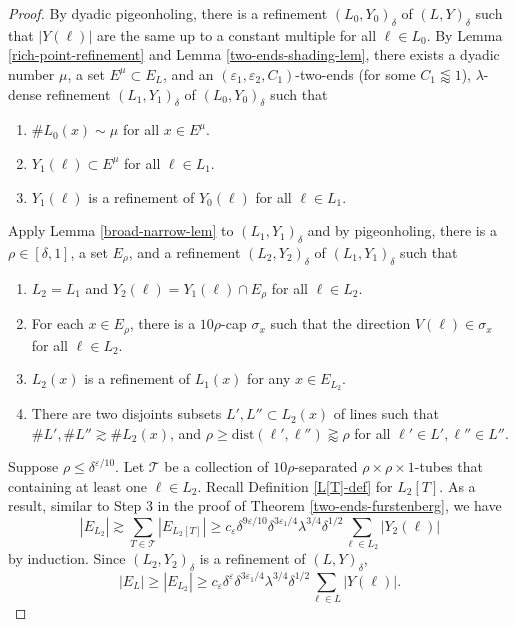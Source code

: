 \documentclass{amsart}
\numberwithin{equation}{section}
\newcommand{\de}{\delta}
\newcommand{\e}{\varepsilon}
\newcommand{\la}{\lambda}
\newcommand{\si}{\sigma}
\newcommand{\cT}{{\mathcal T}}
\begin{document}
\begin{proof}
By dyadic pigeonholing, there is a refinement $(L_0,Y_0)_\de$ of $(L,Y)_\de$ such that $|Y(\ell)|$ are the same up to a constant multiple for all $\ell\in L_0$. 
By Lemma \ref{rich-point-refinement} and Lemma \ref{two-ends-shading-lem}, there exists a dyadic number $\mu$, a set $E^\mu\subset E_L$, and an $(\e_1, \e_2, C_1)$-two-ends (for some $C_1\lessapprox 1$), $\la$-dense refinement $(L_1,Y_1)_\de$ of $(L_0,Y_0)_\de$ such that 
\begin{enumerate}
    \item $\#L_0(x)\sim\mu$ for all $x\in E^\mu$.
    \item $Y_1(\ell)\subset E^\mu$ for all $\ell\in L_1$.
    \item $Y_1(\ell)$ is a refinement of $Y_0(\ell)$ for all $\ell\in L_1$.
\end{enumerate}
Apply Lemma \ref{broad-narrow-lem} to $(L_1, Y_1)_\de$ and by pigeonholing, there is a $\rho\in[\de,1]$, a set $E_\rho$, and a refinement $(L_2, Y_2)_\de$ of $(L_1, Y_1)_\de$ such that
\begin{enumerate}
    \item $L_2=L_1$ and $Y_2(\ell)=Y_1(\ell)\cap E_\rho$ for all $\ell\in L_2$.
    \item For each $x\in E_\rho$, there is a $10\rho$-cap $\si_x$ such that the direction $V(\ell)\in \si_x$ for all $\ell\in L_2$.
    \item $L_2(x)$ is a refinement of $L_1(x)$ for any $x\in E_{L_2}$.
    \item There are two disjoints subsets $L', L''\subset L_2(x)$ of lines such that $\# L', \# L''\gtrsim \# L_2(x)$, and $\rho\geq\text{dist}(\ell',\ell'')\gtrapprox \rho$ for all $\ell'\in L',\ell''\in L''$.
\end{enumerate}


\smallskip

Suppose $\rho\leq \de^{\e/10}$.
Let $\cT$ be a collection of $10\rho$-separated $\rho\times\rho\times 1$-tubes that containing at least one $\ell\in L_2$.
Recall Definition \ref{L[T]-def} for $L_2[T]$.
As a result, similar to Step 3 in the proof of Theorem \ref{two-ends-furstenberg}, we have
\begin{equation}
    |E_{L_2}|\gtrsim \sum_{T\in\cT}|E_{L_2[T]}|\geq c_\e\de^{9\e/10} \de^{3\e_1/4}\la^{3/4}\de^{1/2}\sum_{\ell\in L_2}|Y_2(\ell)|
\end{equation}
by induction. 
Since $(L_2, Y_2)_\de$ is a refinement of $(L, Y)_\de$,
\begin{equation}
    |E_{L}|\geq|E_{L_2}|\geq c_\e\de^\e \de^{3\e_1/4}\la^{3/4}\de^{1/2}\sum_{\ell\in L}|Y(\ell)|.
\end{equation}



\end{proof}
\end{document}
